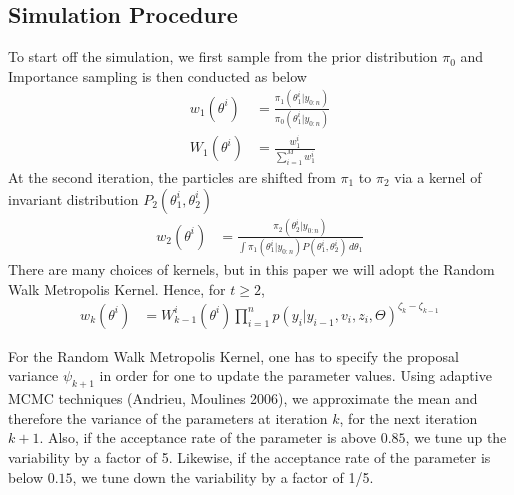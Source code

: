 \documentclass[12pt]{article}
\theoremstyle{definition}
\begin{document}
\subsection{Simulation Procedure}
To start off the simulation, we first sample from the prior distribution $\pi_{0}$ and Importance sampling is then conducted as below
\begin{equation}
	\begin{aligned}
		w_{1}(\theta^{i}) &= \frac{\pi_{1}(\theta_{1}^{i}|y_{0:n})}{\pi_{0}(\theta_{1}^{i}|y_{0:n})} \\
		W_{1}(\theta^{i}) &= \frac{w_{1}^{i}}{\sum_{i=1}^{M} w_{1}^{i}}
	\end{aligned}
\end{equation}
At the second iteration, the particles are shifted from $\pi_{1}$ to $\pi_{2}$ via a kernel of invariant distribution $P_{2}(\theta_{1}^{i},\theta_{2}^{i})$
\begin{equation}
	\begin{aligned}
		w_{2}(\theta^{i}) &= \frac{\pi_{2}(\theta_{2}^{i}|y_{0:n})}{\int \pi_{1}(\theta_{1}^{i}|y_{0:n})P(\theta_{1}^{i},\theta_{2}^{i}) \,d\theta_{1}}
	\end{aligned}
\end{equation}
There are many choices of kernels, but in this paper we will adopt the Random Walk Metropolis Kernel. Hence, for $t\geqslant2$,
\begin{equation}
	\begin{aligned}
		w_{k}(\theta^{i}) &= W_{k-1}^{i}(\theta^{i})\prod_{i=1}^{n} p(y_{i}|y_{i-1},v_{i},z_{i},\Theta)^{\zeta_{k}-\zeta_{k-1}}
	\end{aligned}
\end{equation}

\noindent For the Random Walk Metropolis Kernel, one has to specify the proposal variance $\psi_{k+1}$ in order for one to update the parameter values. Using adaptive MCMC techniques (Andrieu, Moulines 2006), we approximate the mean and therefore the variance of the parameters at iteration $k$, for the next iteration $k+1$. Also, if the acceptance rate of the parameter is above $0.85$, we tune up the variability by a factor of 5. Likewise, if the acceptance rate of the parameter is below $0.15$, we tune down the variability by a factor of 1/5. 
\end{document}

